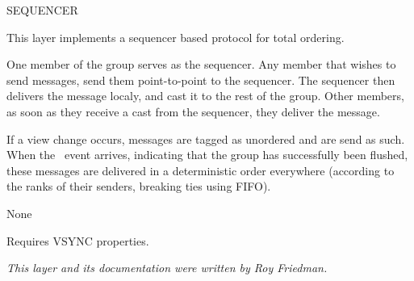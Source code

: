%
%
%
\begin{Layer}{SEQUENCER}

This layer implements a sequencer based protocol for total ordering.

\begin{Protocol}
One member of the group serves as the sequencer. Any member that wishes to
send messages, send them point-to-point to the sequencer. The sequencer then
delivers the message localy, and cast it to the rest of the group. Other
members, as soon as they receive a cast from the sequencer, they deliver
the message.

If a view change occurs, messages are tagged as unordered and are send as
such.
When the \UpView\ event arrives, indicating that the group has successfully
been flushed, these messages are delivered in a deterministic order everywhere
(according to the ranks of their senders, breaking ties using FIFO).
\end{Protocol}

\begin{Parameters}
\item None
\end{Parameters}

\begin{Properties}
\item
Requires VSYNC properties.
\end{Properties}

\begin{Sources}
\end{Sources}

\begin{GenEvent}
\genevent{\DnAck}
\genevent{\DnCast}
\genevent{\DnSend}
\end{GenEvent}

\begin{Testing}
\item
\todo{}
\end{Testing}

\emph{This layer and its documentation were written by Roy Friedman.}
\end{Layer}

